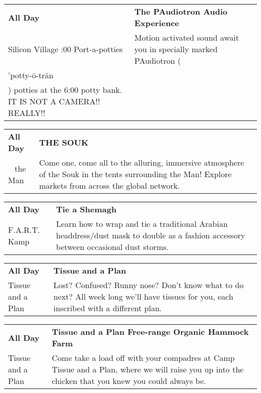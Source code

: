 \begin{tabular}{ p{1in} p{2.2in} }
    \textbf{All Day} & \textbf{The PAudiotron Audio Experience} \\
    Silicon Village \newline 6:00 Port-a-potties & Motion activated sound await you in specially marked PAudiotron (\\'potty-\=o-tr\"an\\) potties at the 6:00 potty bank.  IT IS NOT A CAMERA!!  REALLY!! \\
    \hline 
\end{tabular}
    
\begin{tabular}{ p{1in} p{2.2in} }
    \textbf{All Day} & \textbf{THE SOUK} \\
    ~ \newline the Man & Come one, come all to the alluring, immersive atmosphere of the Souk in the tents surrounding the Man! Explore markets from across the global network. \\
    \hline 
\end{tabular}
    
\begin{tabular}{ p{1in} p{2.2in} }
    \textbf{All Day} & \textbf{Tie a Shemagh} \\
    F.A.R.T. Kamp \newline  & Learn how to wrap and tie a traditional Arabian headdress/dust mask to double as a fashion accessory between occasional dust storms. \\
    \hline 
\end{tabular}
    
\begin{tabular}{ p{1in} p{2.2in} }
    \textbf{All Day} & \textbf{Tissue and a Plan} \\
    Tissue and a Plan \newline  & Lost? Confused? Runny nose? Don't know what to do next? All week long we'll have tissues for you, each inscribed with a different plan. \\
    \hline 
\end{tabular}
    
\begin{tabular}{ p{1in} p{2.2in} }
    \textbf{All Day} & \textbf{Tissue and a Plan Free-range Organic Hammock Farm} \\
    Tissue and a Plan \newline  & Come take a load off with your compadres at Camp Tissue and a Plan, where we will raise you up into the chicken that you knew you could always be. \\
    \hline 
\end{tabular}
    
